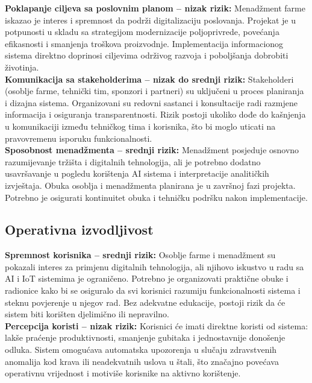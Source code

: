\documentclass{article}
\begin{document}
\noindent
\textbf{Poklapanje ciljeva sa poslovnim planom – nizak rizik:}  
Menadžment farme iskazao je interes i spremnost da podrži digitalizaciju poslovanja. Projekat je u potpunosti u skladu sa strategijom modernizacije poljoprivrede, povećanja efikasnosti i smanjenja troškova proizvodnje. Implementacija informacionog sistema direktno doprinosi ciljevima održivog razvoja i poboljšanja dobrobiti životinja.\\

\noindent
\textbf{Komunikacija sa stakeholderima – nizak do srednji rizik:}  
Stakeholderi (osoblje farme, tehnički tim, sponzori i partneri) su uključeni u proces planiranja i dizajna sistema. Organizovani su redovni sastanci i konsultacije radi razmjene informacija i osiguranja transparentnosti. Rizik postoji ukoliko dođe do kašnjenja u komunikaciji između tehničkog tima i korisnika, što bi moglo uticati na pravovremenu isporuku funkcionalnosti.\\

\noindent
\textbf{Sposobnost menadžmenta – srednji rizik:}  
Menadžment posjeduje osnovno razumijevanje tržišta i digitalnih tehnologija, ali je potrebno dodatno usavršavanje u pogledu korištenja AI sistema i interpretacije analitičkih izvještaja. Obuka osoblja i menadžmenta planirana je u završnoj fazi projekta. Potrebno je osigurati kontinuitet obuka i tehničku podršku nakon implementacije.

\subsection{Operativna izvodljivost}
\textbf{Spremnost korisnika – srednji rizik:}  
Osoblje farme i menadžment su pokazali interes za primjenu digitalnih tehnologija, ali njihovo iskustvo u radu sa AI i IoT sistemima je ograničeno. Potrebno je organizovati praktične obuke i radionice kako bi se osiguralo da svi korisnici razumiju funkcionalnosti sistema i steknu povjerenje u njegov rad. Bez adekvatne edukacije, postoji rizik da će sistem biti korišten djelimično ili nepravilno.\\

\noindent
\textbf{Percepcija koristi – nizak rizik:}  
Korisnici će imati direktne koristi od sistema: lakše praćenje produktivnosti, smanjenje gubitaka i jednostavnije donošenje odluka. Sistem omogućava automatska upozorenja u slučaju zdravstvenih anomalija kod krava ili neadekvatnih uslova u štali, što značajno povećava operativnu vrijednost i motiviše korisnike na aktivno korištenje.
\end{document}
